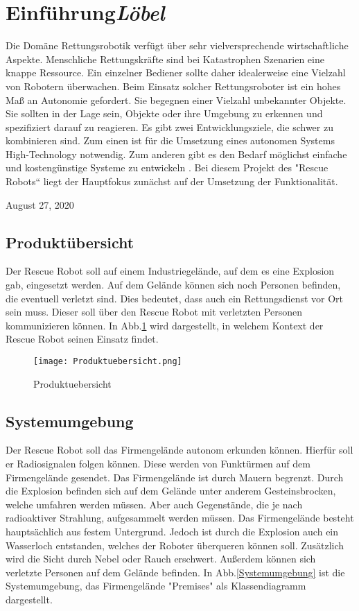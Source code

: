 
\section{Einführung\hfill\textnormal{\emph{Löbel}}}
Die Domäne Rettungsrobotik verfügt über sehr vielversprechende wirtschaftliche Aspekte. Menschliche Rettungskräfte sind bei Katastrophen Szenarien eine knappe Ressource. Ein einzelner Bediener sollte daher idealerweise eine Vielzahl von Robotern überwachen. Beim Einsatz solcher Rettungsroboter ist ein hohes Maß an Autonomie gefordert. Sie begegnen einer Vielzahl unbekannter Objekte. Sie sollten in der Lage sein, Objekte oder ihre Umgebung zu erkennen und spezifiziert darauf zu reagieren. Es gibt zwei Entwicklungsziele, die schwer zu kombinieren sind. Zum einen ist für die Umsetzung eines autonomen Systems High-Technology notwendig. Zum anderen gibt es den Bedarf möglichst einfache und kostengünstige Systeme zu entwickeln \cite{birk2006rescue}. Bei diesem Projekt des "Rescue Robots“ liegt der Hauptfokus zunächst auf der Umsetzung der Funktionalität.

\hfill August 27, 2020

\subsection{Produktübersicht}
Der Rescue Robot soll auf einem Industriegelände, auf dem es eine Explosion gab, eingesetzt werden. Auf dem Gelände können sich noch Personen befinden, die eventuell verletzt sind. Dies bedeutet, dass auch ein Rettungsdienst vor Ort sein muss. Dieser soll über den Rescue Robot mit verletzten Personen kommunizieren können. In Abb.\ref{Produktuebersicht} wird dargestellt, in welchem Kontext der Rescue Robot seinen Einsatz findet.

\begin{figure}[H]
  \centering\texttt{[image: Produktuebersicht.png]}
  \caption{Produktuebersicht}
  \label{Produktuebersicht}
\end{figure}

\subsection{Systemumgebung}
Der Rescue Robot soll das Firmengelände autonom erkunden können. Hierfür soll er Radiosignalen folgen können. Diese werden von Funktürmen auf dem Firmengelände gesendet. Das Firmengelände ist durch Mauern begrenzt. Durch die Explosion befinden sich auf dem Gelände unter anderem Gesteinsbrocken, welche umfahren werden müssen. Aber auch Gegenstände, die je nach radioaktiver Strahlung, aufgesammelt werden müssen. Das Firmengelände besteht hauptsächlich aus festem Untergrund. Jedoch ist durch die Explosion auch ein Wasserloch entstanden, welches der Roboter überqueren können soll. Zusätzlich wird die Sicht durch Nebel oder Rauch erschwert. Außerdem können sich verletzte Personen auf dem Gelände befinden. In Abb.\ref{Systemumgebung} ist die Systemumgebung, das Firmengelände "Premises" als Klassendiagramm dargestellt. 

